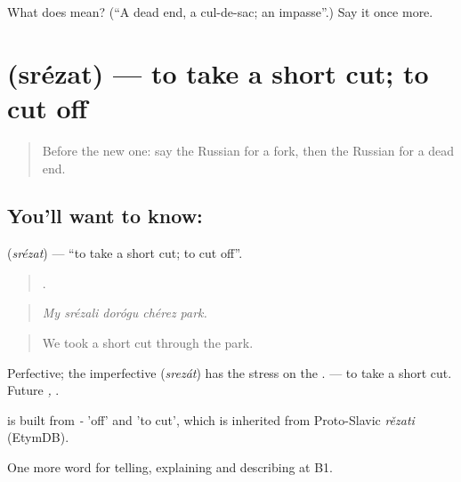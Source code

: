 \begin{tcolorbox}[breakable,colback=teal!4,colframe=teal!35!black,title={Before you move on}]
What does  mean? (\textquotedblleft{}A dead end, a cul-de-sac; an impasse\textquotedblright{}.) Say it once more.
\end{tcolorbox}
\section[\texorpdfstring{\ru{срезать} (srézat)}{срезать (srézat)}]{ (srézat) — to take a short cut; to cut off}

\label{lesson:RU-C439-srezat}



\begin{quote}
Before the new one: say the Russian for a fork, then the Russian for a dead end.
\end{quote}

\subsection*{You'll want to know: }
\textbf{} (\emph{srézat}) — \textquotedblleft{}to take a short cut; to cut off\textquotedblright{}.

\begin{quote}
    .
\end{quote}

\begin{quote}
\emph{My srézali dorógu chérez park.}
\end{quote}

\begin{quote}
We took a short cut through the park.
\end{quote}

Perfective; the imperfective \emph{} (\emph{srezát}) has the stress on the . \emph{ } — to take a short cut. Future \emph{, }.

\begin{cousinweb}
\emph{} is built from \emph{-} 'off' and \emph{} 'to cut', which is inherited from Proto-Slavic \emph{rězati} (EtymDB).
\end{cousinweb}

\begin{grammarlens}[title={What you've built}]
One more word for telling, explaining and describing at B1.
\end{grammarlens}

